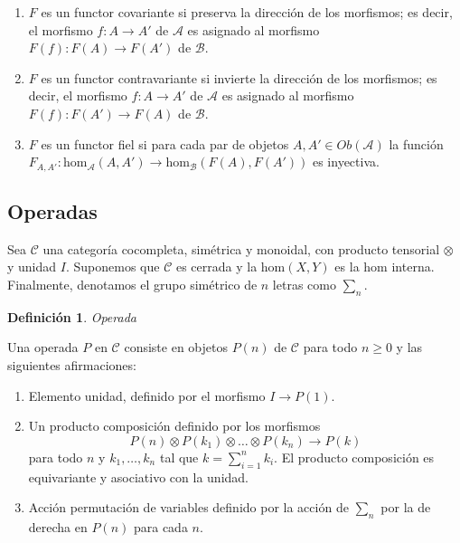 \documentclass[11pt,a4paper,openright,oneside]{article}
\numberwithin{equation}{section}
\newtheorem{defi}[teo]{Definici\'on}
\theoremstyle{definition}
\begin{document}
\begin{enumerate}[(1)]
    \item $F$ es un functor covariante si preserva la direcci\'on de los morfismos; es decir, el morfismo $f: A \longrightarrow A'$ de $\mathcal{A}$ es asignado al morfismo $F(f): F(A) \longrightarrow F(A')$ de $\mathcal{B}$.
    \item $F$ es un functor contravariante si invierte la direcci\'on de los morfismos; es decir, el morfismo $f: A \longrightarrow A'$ de $\mathcal{A}$ es asignado al morfismo $F(f): F(A') \longrightarrow F(A)$ de $\mathcal{B}$.
    \item $F$ es un functor fiel si para cada par de objetos $A, A'\in\mathit{Ob}(\mathcal{A})$ la funci\'on $F_{A,A'}: \text{hom}_{\mathcal{A}}(A, A') \longrightarrow\text {hom}_{\mathcal{B}}(F(A), F(A'))$ es inyectiva.
\end{enumerate}

\subsection{Operadas}
Sea $\mathcal{C}$ una categor\'ia cocompleta, sim\'etrica y monoidal, con producto tensorial $\otimes$ y unidad $I$. %
Suponemos que $\mathcal{C}$ es cerrada y la $\text{hom}(X, Y)$ es la $\text{hom}$ interna. Finalmente, denotamos el grupo sim\'etrico de $n$ letras como $\sum_n$.
\begin{defi}
    Operada
\end{defi}
Una operada $P$ en $\mathcal{C}$ consiste en objetos $P(n)$ de $\mathcal{C}$ para todo $n\ge 0$ y las siguientes afirmaciones: %
\begin{enumerate}[(1)]
    \item Elemento unidad, definido por el morfismo $I \longrightarrow P(1)$.
    \item Un producto composici\'on definido por los morfismos
          $$
              P(n)\otimes P(k_1) \otimes\dots\otimes P(k_n)\longrightarrow P(k)
          $$
          para todo $n$ y $k_1,\dots,k_n$ tal que $k=\sum_{i=1}^{n}{k_i}$. El producto composici\'on es equivariante y asociativo con la unidad.
    \item Acci\'on permutaci\'on de variables definido por la acci\'on de $\sum_n$ por la de derecha en $P(n)$ para cada $n$.
\end{enumerate}
\end{document}
